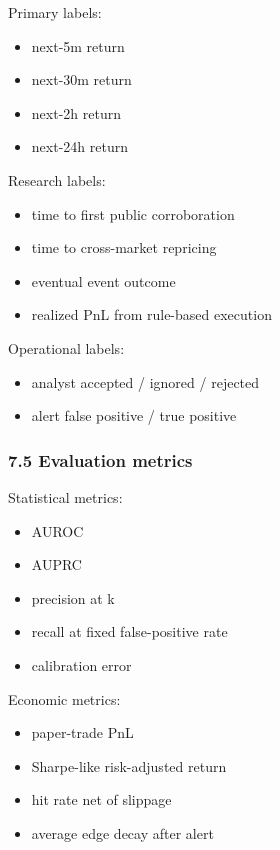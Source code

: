 \documentclass[
]{article}
\providecommand{\tightlist}{%
  \setlength{\itemsep}{0pt}\setlength{\parskip}{0pt}}
\begin{document}
Primary labels:

\begin{itemize}
\tightlist
\item
  next-5m return
\item
  next-30m return
\item
  next-2h return
\item
  next-24h return
\end{itemize}

Research labels:

\begin{itemize}
\tightlist
\item
  time to first public corroboration
\item
  time to cross-market repricing
\item
  eventual event outcome
\item
  realized PnL from rule-based execution
\end{itemize}

Operational labels:

\begin{itemize}
\tightlist
\item
  analyst accepted / ignored / rejected
\item
  alert false positive / true positive
\end{itemize}

\subsubsection{7.5 Evaluation metrics}\label{75-evaluation-metrics}

Statistical metrics:

\begin{itemize}
\tightlist
\item
  AUROC
\item
  AUPRC
\item
  precision at k
\item
  recall at fixed false-positive rate
\item
  calibration error
\end{itemize}

Economic metrics:

\begin{itemize}
\tightlist
\item
  paper-trade PnL
\item
  Sharpe-like risk-adjusted return
\item
  hit rate net of slippage
\item
  average edge decay after alert
\end{itemize}
\end{document}
